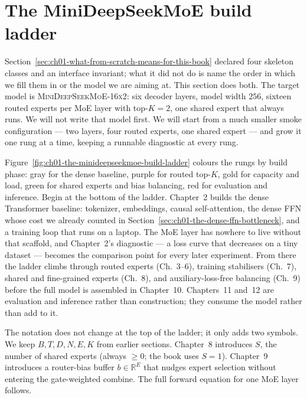 \section{The MiniDeepSeekMoE build ladder}
\label{sec:ch01-the-minideepseekmoe-build-ladder}

Section~\ref{sec:ch01-what-from-scratch-means-for-this-book} declared four skeleton classes and an interface invariant; what it did not do is name the order in which we fill them in or the model we are aiming at. This section does both. The target model is \textsc{MiniDeepSeekMoE-16x2}: six decoder layers, model width $256$, sixteen routed experts per MoE layer with top-$K{=}2$, one shared expert that always runs. We will not write that model first. We will start from a much smaller smoke configuration --- two layers, four routed experts, one shared expert --- and grow it one rung at a time, keeping a runnable diagnostic at every rung.



Figure~\ref{fig:ch01-the-minideepseekmoe-build-ladder} colours the rungs by build phase: gray for the dense baseline, purple for routed top-$K$, gold for capacity and load, green for shared experts and bias balancing, red for evaluation and inference. Begin at the bottom of the ladder. Chapter~2 builds the dense Transformer baseline: tokenizer, embeddings, causal self-attention, the dense FFN whose cost we already counted in Section~\ref{sec:ch01-the-dense-ffn-bottleneck}, and a training loop that runs on a laptop. The MoE layer has nowhere to live without that scaffold, and Chapter~2's diagnostic --- a loss curve that decreases on a tiny dataset --- becomes the comparison point for every later experiment. From there the ladder climbs through routed experts (Ch.~3--6), training stabilisers (Ch.~7), shared and fine-grained experts (Ch.~8), and auxiliary-loss-free balancing (Ch.~9) before the full model is assembled in Chapter~10. Chapters~11 and~12 are evaluation and inference rather than construction; they consume the model rather than add to it.

The notation does not change at the top of the ladder; it only adds two symbols. We keep $B, T, D, N, E, K$ from earlier sections. Chapter~8 introduces $S$, the number of shared experts (always $\ge 0$; the book uses $S=1$). Chapter~9 introduces a router-bias buffer $b \in \mathbb{R}^E$ that nudges expert selection without entering the gate-weighted combine. The full forward equation for one MoE layer follows.

